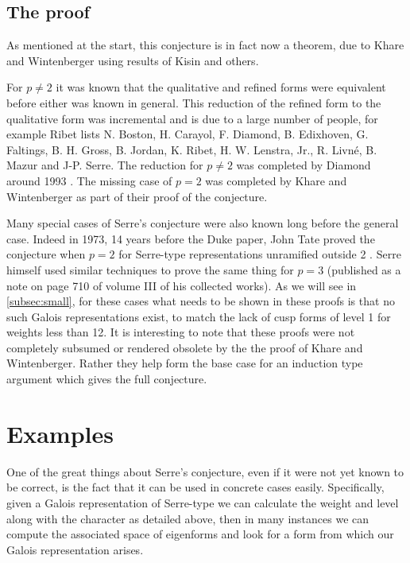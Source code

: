 \documentclass[a4paper,12pt]{article}
\begin{document}
\subsection{The proof}\label{subsec:proof}
As mentioned at the start, this conjecture is in fact now a theorem, due to Khare and Wintenberger using results of Kisin and others.

For $p \ne 2$ it was known that the qualitative and refined forms were equivalent before either was known in general.
This reduction of the refined form to the qualitative form was incremental and is due to a large number of people, for example Ribet \cite{Ribet94} lists N. Boston, H. Carayol, F. Diamond, B. Edixhoven, G. Faltings, B. H. Gross, B. Jordan, K. Ribet, H. W. Lenstra, Jr., R. Livn\'e, B. Mazur and J-P. Serre.
The reduction for $p\ne 2$ was completed by Diamond around 1993 \cite{Diamond}.
The missing case of $p=2$ was completed by Khare and Wintenberger as part of their proof of the conjecture.

Many special cases of Serre's conjecture were also known long before the general case.
Indeed in 1973, 14 years before the Duke paper, John Tate proved the conjecture when $p = 2$ for Serre-type representations unramified outside 2 \cite{Tate}.
Serre himself used similar techniques to prove the same thing for $p = 3$ (published as a note on page 710 of volume III of his collected works).
As we will see in \cref{subsec:small}, for these cases what needs to be shown in these proofs is that no such Galois representations exist, to match the lack of cusp forms of level 1 for weights less than 12.
It is interesting to note that these proofs were not completely subsumed or rendered obsolete by the the proof of Khare and Wintenberger.
Rather they help form the base case for an induction type argument which gives the full conjecture.



\section{Examples}
One of the great things about Serre's conjecture, even if it were not yet known to be correct, is the fact that it can be used in concrete cases easily.
Specifically, given a Galois representation of Serre-type we can calculate the weight and level along with the character as detailed above, then in many instances we can compute the associated space of eigenforms and look for a form from which our Galois representation arises.
\end{document}
